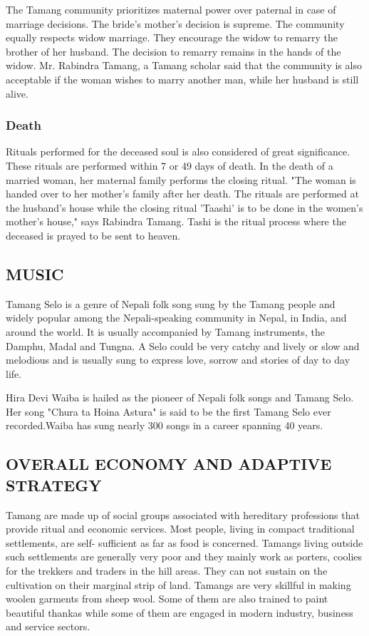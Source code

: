 \documentclass[a4paper,14pt]{article}
\begin{document}
\begin{flushleft}
The Tamang community prioritizes maternal power over paternal in case of marriage decisions. The bride's mother's decision is supreme. The community equally respects widow marriage. They encourage the widow to remarry the brother of her husband.  The decision to remarry remains in the hands of the widow. Mr. Rabindra Tamang, a Tamang scholar said that the community is also acceptable if the woman wishes to marry another man, while her husband is still alive. 

\subsubsection{Death}
Rituals performed for the deceased soul is also considered of great significance. These rituals are performed within 7 or 49 days of death. In the death of a married woman, her maternal family performs the closing ritual. "The woman is handed over to her mother's family after her death. The rituals are performed at the husband's house while the closing ritual 'Taashi' is to be done in the women's mother's house," says Rabindra Tamang. Tashi is the ritual process where the deceased is prayed to be sent to heaven. 




	\newpage

	\subsection{MUSIC}
	Tamang Selo  is a genre of Nepali folk song sung by the Tamang people and widely popular among the Nepali-speaking community in Nepal, in India, and around the world. It is usually accompanied by Tamang instruments, the Damphu, Madal and Tungna. A Selo could be very catchy and lively or slow and melodious and is usually sung to express love, sorrow and stories of day to day life.
	
	Hira Devi Waiba is hailed as the pioneer of Nepali folk songs and Tamang Selo. Her song "Chura ta Hoina Astura"  is said to be the first Tamang Selo ever recorded.Waiba has sung nearly 300 songs in a career spanning 40 years.




	\newpage
	\subsection{OVERALL ECONOMY AND ADAPTIVE STRATEGY}

	Tamang are made up of social groups associated with hereditary professions that provide ritual and economic services. Most people, living in compact traditional settlements, are self- sufficient as far as food is concerned. Tamangs living outside such settlements are generally very poor and they mainly work as porters, coolies for the trekkers and traders in the hill areas. They can not sustain on the cultivation on their marginal strip of land. Tamangs are very skillful in making woolen garments from sheep wool. Some of them are also trained to paint beautiful thankas while some of them are engaged in modern industry, business and service sectors.



\end{flushleft}
\end{document}
